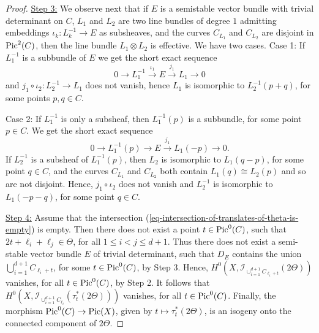 \documentclass[12pt]{amsart}
\numberwithin{equation}{subsection}
\theoremstyle{plain}
\theoremstyle{definition}
\newcommand{\RightArrowOf}[1]{\stackrel{#1}{\rightarrow}}
\newcommand{\Pic}{{\rm Pic}}
\newcommand{\Ideal}[1]{{\mathcal I}_{#1}}
\begin{document}
\begin{proof}
\underline{Step 3:} We observe next that if $E$ is a semistable vector bundle with trivial determinant on $C$, $L_1$ and $L_2$ are two line bundles of degree $1$ admitting embeddings $\iota_k:L_k^{-1}\rightarrow E$ as subsheaves, and the curves $C_{L_1}$ and $C_{L_2}$ are disjoint in $\Pic^2(C)$, then the line bundle $L_1\otimes L_2$ is effective. We have two cases. Case 1: If $L_1^{-1}$ is a subbundle of $E$ we get the short exact sequence
\[
0\rightarrow L_1^{-1}\RightArrowOf{\iota_1} E\RightArrowOf{j_1} L_1\rightarrow 0
\]
and $j_1\circ \iota_2:L_2^{-1}\rightarrow L_1$ does not vanish, hence $L_1$ is isomorphic to $L_2^{-1}(p+q)$, for some points $p,q\in C$. 

Case 2: If $L_1^{-1}$ is only a subsheaf, then $L_1^{-1}(p)$ is a subbundle, for some point $p\in C$. 
We get the short exact sequence
\[
0\rightarrow L_1^{-1}(p)\rightarrow E \RightArrowOf{j_1} L_1(-p)\rightarrow 0.
\]
If $L_2^{-1}$ is a subsheaf of $L_1^{-1}(p)$, then $L_2$ is isomorphic to $L_1(q-p)$, for some point $q\in C$, and the curves $C_{L_1}$ and $C_{L_2}$ both contain $L_1(q)\cong L_2(p)$ and so are not disjoint. Hence, $j_1 \circ \iota_2$ does not vanish and $L_2^{-1}$ is isomorphic to $L_1(-p-q)$, for some point $q\in C$.

\underline{Step 4:} Assume that the intersection (\ref{eq-intersection-of-translates-of-theta-is-empty}) is empty. Then there does not exist a point $t\in \Pic^0(C)$, such that $2t+\ell_i+\ell_j\in\Theta$, for all $1\leq i<j\leq d+1$. Thus there does not exist a semi-stable vector bundle $E$ of trivial determinant, such that $D_E$ contains the union $\bigcup_{i=1}^{d+1}C_{\ell_i+t}$, for some $t\in \Pic^0(C)$, by Step 3. Hence, $H^0(X,\Ideal{\cup_{i=1}^{d+1}C_{\ell_i+t}}(2\Theta))$
vanishes, for all $t\in \Pic^0(C)$, by Step 2. It follows that $H^0(X,\Ideal{\cup_{i=1}^{d+1}C_{\ell_i}}(\tau_t^*(2\Theta)))$ vanishes,  for all $t\in \Pic^0(C)$. Finally, the morphism $\Pic^0(C)\rightarrow \Pic(X)$, given by $t\mapsto \tau_t^*(2\Theta)$, is an isogeny onto the connected component of $2\Theta$.
\end{proof}
\end{document}
